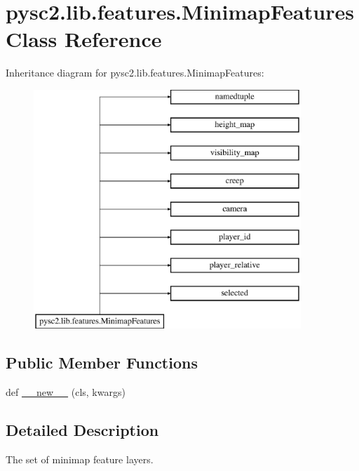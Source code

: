 \hypertarget{classpysc2_1_1lib_1_1features_1_1_minimap_features}{}\section{pysc2.\+lib.\+features.\+Minimap\+Features Class Reference}
\label{classpysc2_1_1lib_1_1features_1_1_minimap_features}
Inheritance diagram for pysc2.\+lib.\+features.\+Minimap\+Features\+:\begin{figure}[H]
\begin{center}
\leavevmode
\includegraphics[height=9.000000cm]{classpysc2_1_1lib_1_1features_1_1_minimap_features}
\end{center}
\end{figure}
\subsection*{Public Member Functions}
\begin{DoxyCompactItemize}
\item 
def \mbox{\hyperlink{classpysc2_1_1lib_1_1features_1_1_minimap_features_a1f02bf52fac52f980a4f09afbbe34731}{\+\_\+\+\_\+new\+\_\+\+\_\+}} (cls, kwargs)
\end{DoxyCompactItemize}


\subsection{Detailed Description}
\begin{DoxyVerb}The set of minimap feature layers.\end{DoxyVerb}
 

